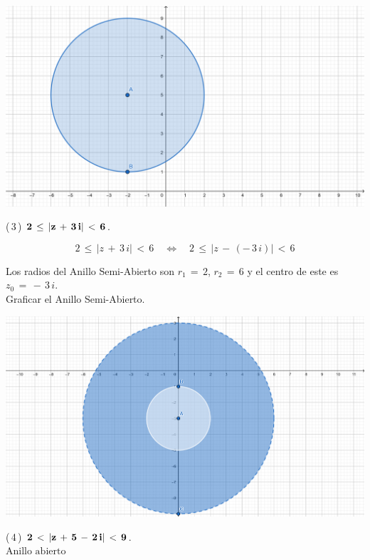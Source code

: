 \documentclass[a4paper,11pt,openany]{book}
\begin{document}
\begin{center}
    \includegraphics[width=15cm]{Gra-Ej-2.png}
\end{center}

\textcolor{ao(english)}{(\,3\,)} $\bf{2\,\leq\,|z\,+\,3\,i|\,<\,6}$.

$$2\,\leq\,|z\,+\,3\,i|\,<\,6 \quad\iff\quad 2\,\leq\,|z\,-\,(-\,3\,i)|\,<\,6$$

Los radios del Anillo Semi-Abierto son $r_{1}\,=\,2$, $r_{2}\,=\,6$ y el centro de este es $z_{0}\,=\,-\,3\,i$.\\

\textcolor{ao(english)}{} Graficar el Anillo Semi-Abierto.

\begin{center}
     \includegraphics[width=15cm]{Gra-Ej-3.png}
\end{center}

\textcolor{ao(english)}{(\,4\,)} $\bf{2\,<\,|z\,+\,5\,-\,2\,i|\,<\,9}$.\\

$\text{Anillo abierto}$\\
\end{document}
